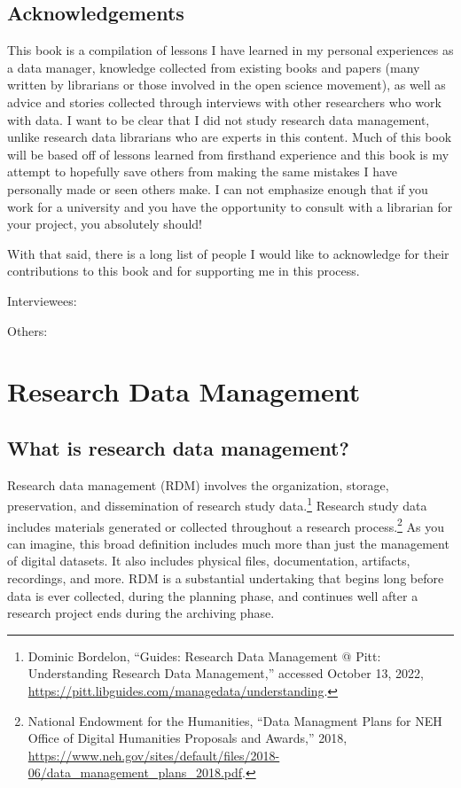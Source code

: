 \documentclass[
]{book}
\begin{document}
\hypertarget{acknowledgements}{%
\section{Acknowledgements}\label{acknowledgements}}

This book is a compilation of lessons I have learned in my personal experiences as a data manager, knowledge collected from existing books and papers (many written by librarians or those involved in the open science movement), as well as advice and stories collected through interviews with other researchers who work with data. I want to be clear that I did not study research data management, unlike research data librarians who are experts in this content. Much of this book will be based off of lessons learned from firsthand experience and this book is my attempt to hopefully save others from making the same mistakes I have personally made or seen others make. I can not emphasize enough that if you work for a university and you have the opportunity to consult with a librarian for your project, you absolutely should!

With that said, there is a long list of people I would like to acknowledge for their contributions to this book and for supporting me in this process.

Interviewees:

Others:

\hypertarget{research-data-management}{%
\chapter{Research Data Management}\label{research-data-management}}

\hypertarget{what-is-research-data-management}{%
\section{What is research data management?}\label{what-is-research-data-management}}

Research data management (RDM) involves the organization, storage, preservation, and dissemination of research study data.\footnote{Dominic Bordelon, {``Guides: Research Data Management @ Pitt: Understanding Research Data Management,''} accessed October 13, 2022, \url{https://pitt.libguides.com/managedata/understanding}.} Research study data includes materials generated or collected throughout a research process.\footnote{National Endowment for the Humanities, {``Data Managment Plans for {NEH} Office of Digital Humanities Proposals and Awards,''} 2018, \url{https://www.neh.gov/sites/default/files/2018-06/data_management_plans_2018.pdf}.} As you can imagine, this broad definition includes much more than just the management of digital datasets. It also includes physical files, documentation, artifacts, recordings, and more. RDM is a substantial undertaking that begins long before data is ever collected, during the planning phase, and continues well after a research project ends during the archiving phase.
\end{document}
